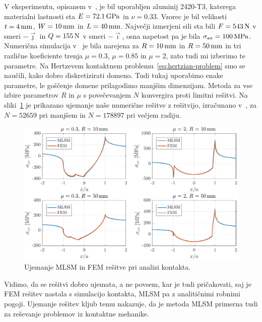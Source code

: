 \documentclass[12pt,a4paper,twoside]{article}
\theoremstyle{definition} %
\theoremstyle{plain} %
\numberwithin{equation}{section}
\newcommand{\vi}{\vec{\imath}}
\newcommand{\vj}{\vec{\jmath}}
\newcommand{\sax}{\ensuremath{\sigma_{\text{ax}}}}
\begin{document}
V eksperimentu, opisanem v~\cite{hojjati2014prediction}, je bil uporabljen aluminij 2420-T3, katerega
materialni lastnosti sta  $E = \unit[72.1]{GPa}$ in $\nu = 0.33$. Vzorec je bil velikosti $t =
\unit[4]{mm}$, $W = \unit[10]{mm}$ in $L = \unit[40]{mm}$. Največji izmerjeni sili sta bili $F =
\unit[543]{N}$ v smeri $-\vj$ in $Q = \unit[155]{N}$ v smeri $-\vi$, osna napetost pa je bila $\sax
= \unit[100]{MPa}$. Numerična simulacija v~\cite{pereira2016convergence} je bila narejena za $R =
\unit[10]{mm}$ in $R = \unit[50]{mm}$ in tri različne koeficiente trenja $\mu = 0.3$, $\mu = 0.85$
in $\mu = 2$, zato tudi mi izberimo te parametre. Na Hertzevem kontaktnem
problemu~\eqref{eq:hertzian-problem} smo se naučili, kako dobro diskretizirati domeno. Tudi tukaj
uporabimo enake parametre, le goščenje domene prilagodimo manjšim dimenzijam. Metoda za vse
izbire parametrov $R$ in $\mu$ s povečevanjem $N$ konvergira proti limitni rešitvi. Na
sliki~\ref{fig:fwo-ujemanje} je prikazano ujemanje naše numerične rešitve z rešitvijo, izračunano
v~\cite{pereira2016convergence}, za $N = 52659$ pri manjšem in $N = 178897$ pri večjem radiju.

\begin{figure}[h]
  \centering
  \includegraphics[width=\textwidth]{images/fwo_cases.pdf}
  \caption{Ujemanje MLSM in FEM rešitve pri analizi kontakta.}
  \label{fig:fwo-ujemanje}
\end{figure}

Vidimo, da se rešitvi dobro ujemata, a ne povsem, kar je tudi pričakovati, saj je FEM rešitev
nastala s simulacijo kontakta, MLSM pa z analitičnimi robnimi pogoji. Ujemanje rešitev kljub temu
nakazuje, da je metoda MLSM primerna tudi za reševanje problemov iz kontaktne mehanike.
\end{document}
